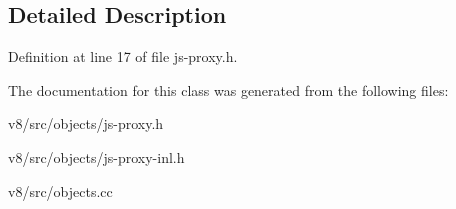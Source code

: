 \subsection{Detailed Description}


Definition at line 17 of file js-\/proxy.\+h.



The documentation for this class was generated from the following files\+:\begin{DoxyCompactItemize}
\item 
v8/src/objects/js-\/proxy.\+h\item 
v8/src/objects/js-\/proxy-\/inl.\+h\item 
v8/src/objects.\+cc\end{DoxyCompactItemize}
